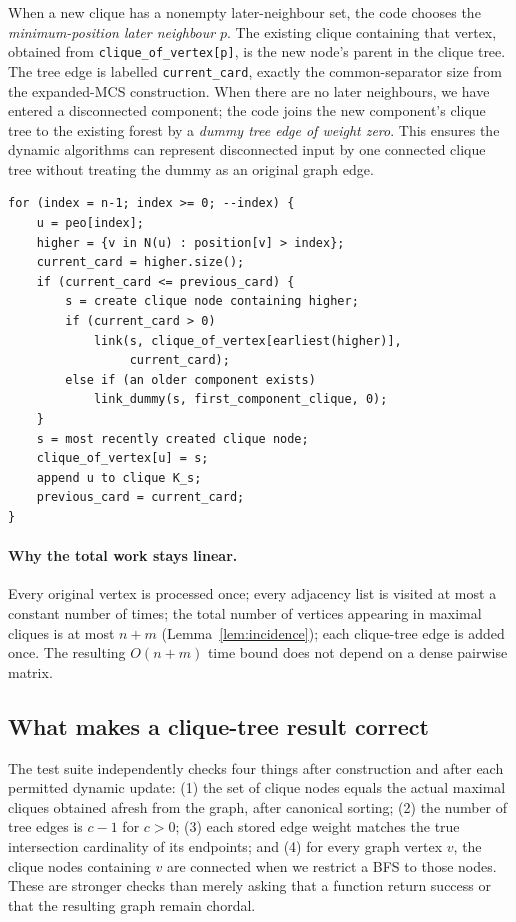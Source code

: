 When a new clique has a nonempty later-neighbour set, the code chooses the \emph{minimum-position later neighbour} \(p\).  The existing clique containing that vertex, obtained from \texttt{clique\_of\_vertex[p]}, is the new node's parent in the clique tree.  The tree edge is labelled \texttt{current\_card}, exactly the common-separator size from the expanded-MCS construction.  When there are no later neighbours, we have entered a disconnected component; the code joins the new component's clique tree to the existing forest by a \emph{dummy tree edge of weight zero}.  This ensures the dynamic algorithms can represent disconnected input by one connected clique tree without treating the dummy as an original graph edge.

\begin{lstlisting}[caption={Conceptual expanded MCS, matching the frozen constructor.}]
for (index = n-1; index >= 0; --index) {
    u = peo[index];
    higher = {v in N(u) : position[v] > index};
    current_card = higher.size();
    if (current_card <= previous_card) {
        s = create clique node containing higher;
        if (current_card > 0)
            link(s, clique_of_vertex[earliest(higher)],
                 current_card);
        else if (an older component exists)
            link_dummy(s, first_component_clique, 0);
    }
    s = most recently created clique node;
    clique_of_vertex[u] = s;
    append u to clique K_s;
    previous_card = current_card;
}
\end{lstlisting}
\paragraph{Why the total work stays linear.} Every original vertex is processed once; every adjacency list is visited at most a constant number of times; the total number of vertices appearing in maximal cliques is at most \(n+m\) (Lemma~\ref{lem:incidence}); each clique-tree edge is added once.  The resulting \(O(n+m)\) time bound does not depend on a dense pairwise matrix.

\subsection{What makes a clique-tree result correct}
The test suite independently checks four things after construction and after each permitted dynamic update: (1) the set of clique nodes equals the actual maximal cliques obtained afresh from the graph, after canonical sorting; (2) the number of tree edges is \(c-1\) for \(c>0\); (3) each stored edge weight matches the true intersection cardinality of its endpoints; and (4) for every graph vertex \(v\), the clique nodes containing \(v\) are connected when we restrict a BFS to those nodes.  These are stronger checks than merely asking that a function return success or that the resulting graph remain chordal.

